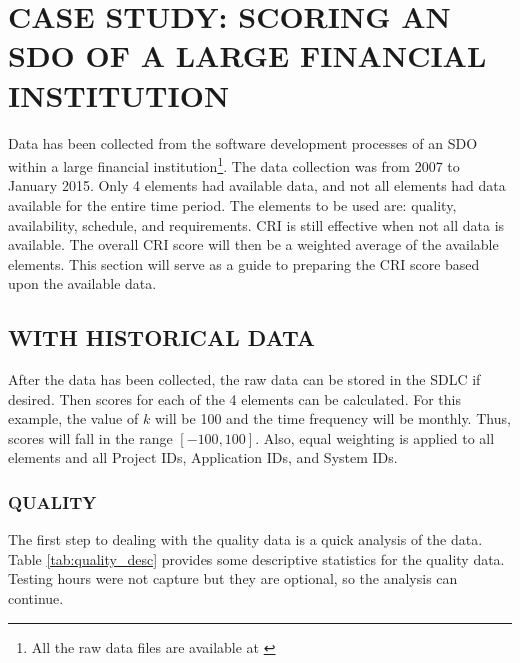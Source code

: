 \documentclass[SDSUThesis.tex]{subfiles}
\begin{document}
\section{CASE STUDY: SCORING AN SDO OF A LARGE FINANCIAL INSTITUTION}

    Data has been collected from the software development processes of
    an SDO within a large financial institution\footnote{All the raw data 
    files are available at \cite{Swanstrom2015}}.
    The data collection was from 2007 to January 2015. Only 4 elements had available
    data, and not all elements had data available for the entire time period.  The
    elements to be used are: quality, availability, schedule, and requirements.
    CRI is still effective when not all data is available.
    The overall CRI score will then be a 
    weighted average of the available elements. 
    This section will serve as a guide to preparing the CRI score
    based upon the available data.  

    \subsection{WITH HISTORICAL DATA}
        After the data has been collected, the raw data can be stored in the SDLC
        if desired.  Then scores for each of the 4 elements can be calculated.
        For this example, the value of $k$ will be 100 and the time
        frequency will be monthly.  Thus, scores will fall
        in the range $[-100,100]$.  Also, equal weighting is applied to 
        all elements and all Project IDs, Application IDs, and System IDs.
        \subsubsection{QUALITY}
            The first step to dealing with the quality data is a quick
            analysis of the data.  Table \ref{tab:quality_desc} provides
            some descriptive statistics for the quality data.  Testing hours
            were not capture but they are optional, so the analysis can 
            continue.
            
\end{document}
